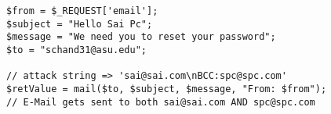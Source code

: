 \begin{lstlisting}
$from = $_REQUEST['email'];
$subject = "Hello Sai Pc";
$message = "We need you to reset your password";
$to = "schand31@asu.edu";

// attack string => 'sai@sai.com\nBCC:spc@spc.com'
$retValue = mail($to, $subject, $message, "From: $from");
// E-Mail gets sent to both sai@sai.com AND spc@spc.com
\end{lstlisting}